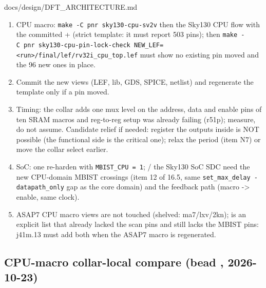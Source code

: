 \begin{relocated}{docs/design/DFT_ARCHITECTURE.md}
\begin{enumerate}
\def\labelenumi{\arabic{enumi}.}
\tightlist
\item
  CPU macro:
  \texttt{make\ -\allowbreak{}C\ pnr\ sky130-\allowbreak{}cpu-\allowbreak{}sv2v}
  then the Sky130 CPU flow with the committed  +
   (strict template: it must report 503 pins);
  then
  \texttt{make\ -\allowbreak{}C\ pnr\ sky130-\allowbreak{}cpu-\allowbreak{}pin-\allowbreak{}lock-\allowbreak{}check\ NEW\_\allowbreak{}LEF=\allowbreak{}<run>/\allowbreak{}final/\allowbreak{}lef/\allowbreak{}rv32i\_\allowbreak{}cpu\_\allowbreak{}top.\allowbreak{}lef}
  must show no existing pin moved and the 96 new ones in place.
\item
  Commit the new  views (LEF, lib, GDS,
  SPICE, netlist) and regenerate the template only if a pin moved.
\item
  Timing: the collar adds one mux level on the address, data and enable
  pins of ten SRAM macros and  reg-to-reg setup was already
  failing (r51p); measure, do not assume. Candidate relief if needed:
  register the  outputs inside  is NOT
  possible (the functional side is the critical one); relax the period
  (item N7) or move the collar select earlier.
\item
  SoC: one re-harden with
  \texttt{MBIST\_\allowbreak{}CPU\ =\allowbreak{}\ 1};
   / the Sky130 SoC SDC need the new
  CPU-domain MBIST crossings (item 12 of 16.5, same
  \texttt{set\_\allowbreak{}max\_\allowbreak{}delay\ -\allowbreak{}datapath\_\allowbreak{}only}
  gap as the core domain) and the  feedback path (macro
   -\textgreater{}  enable,
  same clock).
\item
  ASAP7 CPU macro views are not touched (shelved:
  ma7/\allowbreak{}lxv/\allowbreak{}2kn);
   is an explicit list that already
  lacked the scan pins and still lacks the MBIST pins: j41m.13 must add
  both when the ASAP7 macro is regenerated.
\end{enumerate}

\subsection{\texorpdfstring{CPU-macro collar-local compare (bead
,
2026-10-23)}{CPU-macro collar-local compare (bead , 2026-10-23)}}\label{tm:ch:dft-architecture:1612-cpu-macro-collar-local-compare-bead-c54a-2026-10-23}


\end{relocated}
